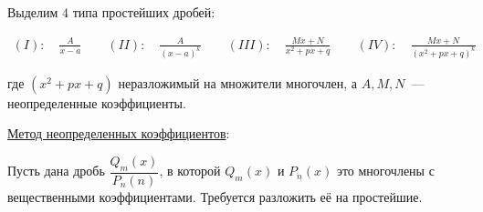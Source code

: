 
Выделим \(4\) типа простейших дробей:

\begin{align*}
  (I): \quad \frac{A}{x - a} \qquad
  (II): \quad \frac{A}{(x - a)^k} \qquad
  (III): \quad \frac{Mx + N}{x^2 + px + q} \qquad
  (IV): \quad \frac{Mx + N}{(x^2 + px + q)^{k}} \qquad
\end{align*}

где \((x^2 + px + q)\) неразложимый на множители многочлен, а \(A, M, N\)~---
неопределенные коэффициенты.

\underline{Метод неопределенных коэффициентов}:

Пусть дана дробь \(\dfrac{Q_{m}(x)}{P_{n}(n)}\), в которой \(Q_{m}(x)\) и
\(P_{n}(x)\) это многочлены с вещественными коэффициентами. Требуется
разложить её на простейшие.

